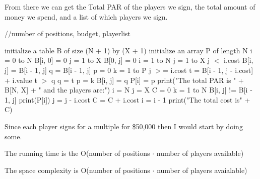 \documentclass[addpoints,11pt]{exam}
\begin{document}
\begin{questions}
\begin{solutionorbox}
From there we can get the Total PAR of the players we sign, the total amount of money we spend, and a list of which players we sign.

\begin{codebox}
    \li //number of positions, budget, playerlist

    \li initialize a table B of size (N + 1) by (X + 1)
    \li initialize an array P of length N
    \li \For i = 0 to N \Do
        \li B[i, 0] = 0
    \End
    \li \For j = 1 to X \Do
        \li B[0, j] = 0
    \End
    \li \For i = 1 to N \Do
        \li \For j = 1 to X \Do
            \li \If j $<$ i.cost \Do
                \li B[i, j] = B[i - 1, j]
                \End
            \li q = B[i - 1, j]
            \li p = 0
            \li \For k = 1 to P \Do
                \li \If j $>$= i.cost \Do
                    \li t = B[i - 1, j - i.cost] + i.value
                    \li \If t $>$ q \Do
                        \li q = t
                        \li p = k
                    \End
                    \End
                    \End
            \li B[i, j] = q
            \li P[i] = p
            \End
            \End
    \li print("The total PAR is " + B[N, X] + " and the players are:")
    \li i = N
    \li j = X
    \li C = 0
    \li \For k = 1 to N \Do
        \li \If B[i, j] != B[i - 1, j] \Do
        \li print(P[i])
            \li j = j - i.cost
            \li C = C + i.cost
            \End
        \li i = i - 1
        \End
    \li print("The total cost is" + C)

    \end{codebox}


Since each player signs for a multiple for \$50,000 then I would start by doing some.

The running time is the O(number of positions $\cdot$ number of players available)

The space complexity is O(number of positions $\cdot$ number of players avaialable)
\end{solutionorbox}


\end{questions}


\end{document}

